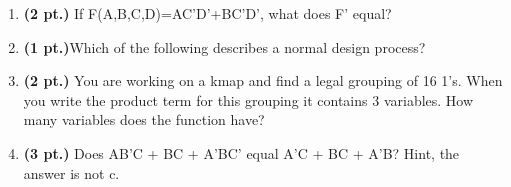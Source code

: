\documentclass{article}
\begin{document}
\begin{enumerate}
\item {\bf (2 pt.)} If F(A,B,C,D)=AC'D'+BC'D', what does F' equal?

\item {\bf (1 pt.)}Which of the following describes a normal
design process?

\item {\bf (2 pt.)} You are working on a kmap and find a legal grouping 
of 16 1's.  When you write the product term for this grouping it contains 3
variables.  How many variables does the function have?
\pagebreak
\item {\bf (3 pt.)} Does AB'C + BC + A'BC' equal A'C + BC + A'B?
Hint, the answer is not c.


\end{enumerate}
\end{document}
